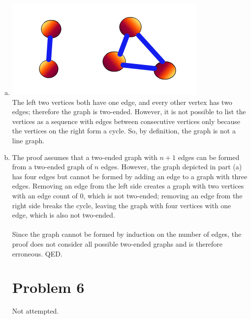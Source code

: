 \documentclass[11pt]{article}
\begin{document}
\begin{enumerate}[(a)]
	\item
		\includegraphics[scale=.5, valign = t]{images/p5}\\
	The left two vertices both have one edge, and every other vertex has two edges; therefore the graph is two-ended. However, it is not possible to list the vertices as a sequence with edges between consecutive vertices only because the vertices on the right form a cycle. So, by definition, the graph is not a line graph.
	
	\item
	The proof assumes that a two-ended graph with $n+1$ edges can be formed from a two-ended graph of $n$ edges. However, the graph depicted in part (a) has four edges but cannot be formed by adding an edge to a graph with three edges. Removing an edge from the left side creates a graph with two vertices with an edge count of 0, which is not two-ended; removing an edge from the right side breaks the cycle, leaving the graph with four vertices with one edge, which is also not two-ended. \\\\
	Since the graph cannot be formed by induction on the number of edges, the proof does not consider all possible two-ended graphs and is therefore erroneous. QED. 
	
\section*{Problem 6}

Not attempted.

\end{enumerate}
\end{document}
